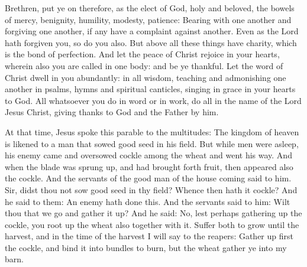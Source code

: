 \begin{multicols}{2}
\bigskip



Brethren, put ye on therefore, as the elect of God, holy and beloved, the bowels of
mercy, benignity, humility, modesty, patience: Bearing with one another and
forgiving one another, if any have a complaint against another. Even as the
Lord hath forgiven you, so do you also.  But above all these things have
charity, which is the bond of perfection.  And let the peace of Christ rejoice
in your hearts, wherein also you are called in one body: and be ye thankful.
Let the word of Christ dwell in you abundantly: in all wisdom, teaching and
admonishing one another in psalms, hymns and spiritual canticles, singing in
grace in your hearts to God.  All whatsoever you do in word or in work, do all
in the name of the Lord Jesus Christ, giving thanks to God and the Father by
him.



At that time, Jesus spoke this parable to the multitudes: The kingdom of heaven is likened
to a man that sowed good seed in his field.  But while men were asleep, his
enemy came and oversowed cockle among the wheat and went his way.  And when the
blade was sprung up, and had brought forth fruit, then appeared also the
cockle.  And the servants of the good man of the house coming said to him.
Sir, didst thou not sow good seed in thy field? Whence then hath it cockle?
And he said to them: An enemy hath done this. And the servants said to him:
Wilt thou that we go and gather it up?  And he said: No, lest perhaps gathering
up the cockle, you root up the wheat also together with it.  Suffer both to
grow until the harvest, and in the time of the harvest I will say to the
reapers: Gather up first the cockle, and bind it into bundles to burn, but the
wheat gather ye into my barn.

\bigskip





\end{multicols}
